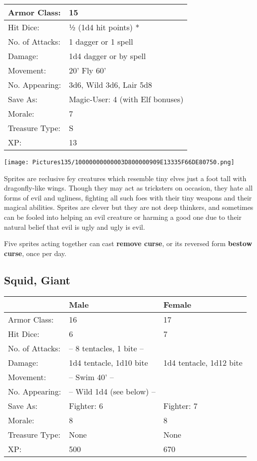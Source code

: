 \documentclass[a4paper,twoside,openany,10pt]{book}
\begin{document}
\begin{multicols}{2}
\begin{tabularx}{0.50\textwidth}{@{}lX@{}}
Armor Class: & 15 \\\hline
Hit Dice: & ½ (1d4 hit points) * \\\hline
No. of Attacks: & 1 dagger or 1 spell \\\hline
Damage: & 1d4 dagger or by spell \\\hline
Movement: & 20' Fly 60' \\\hline
No. Appearing: & 3d6, Wild 3d6, Lair 5d8 \\\hline
Save As: & Magic-User: 4 (with Elf bonuses) \\\hline
Morale: & 7 \\\hline
Treasure Type: & S \\\hline
XP: & 13 \\\hline
\end{tabularx}\medskip

\begin{center}
\texttt{[image: Pictures135/10000000000003D800000909E13335F66DE80750.png]}
\end{center}

Sprites are reclusive fey creatures which resemble tiny elves just a foot tall with dragonfly-like wings. Though they may act as tricksters on occasion, they hate all forms of evil and ugliness, fighting all such foes with their tiny weapons and their magical abilities. Sprites are clever but they are not deep thinkers, and sometimes can be fooled into helping an evil creature or harming a good one due to their natural belief that evil is ugly and ugly is evil. 

Five sprites acting together can cast \textbf{remove curse}, or its reversed form \textbf{bestow curse}, once per day.

\subsection*{Squid, Giant}\label{squid-giant}

\begin{tabularx}{0.50\textwidth}{@{}lXX@{}}
& Male & Female \\\hline
Armor Class: & 16 & 17 \\\hline
Hit Dice: & 6 & 7 \\\hline
No. of Attacks: & -- 8 tentacles, 1 bite -- & \\\hline
Damage: & 1d4 tentacle, 1d10 bite & 1d4 tentacle, 1d12 bite \\\hline
Movement: & -- Swim 40' -- & \\\hline
No. Appearing: & -- Wild 1d4 (see below) -- & \\\hline
Save As: & Fighter: 6 & Fighter: 7 \\\hline
Morale: & 8 & 8 \\\hline
Treasure Type: & None & None \\\hline
XP: & 500 & 670 \\\hline
\end{tabularx}\medskip


\end{multicols}
\end{document}
